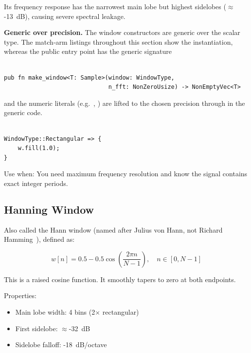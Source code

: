 Its frequency response has the narrowest main lobe but highest
sidelobes ($\approx$-13~dB), causing severe spectral leakage.

\textbf{Generic over precision.} The window constructors are generic
over the scalar type. The match-arm listings throughout this section
show the  instantiation, whereas the public entry point has
the generic signature

\begin{lstlisting}[caption={Generic make-window constructor signature}]

pub fn make_window<T: Sample>(window: WindowType,
                              n_fft: NonZeroUsize) -> NonEmptyVec<T>
\end{lstlisting}

\noindent and the numeric literals (e.g.\ , ) are
lifted to the chosen precision through  in the
generic code.

\begin{lstlisting}[caption={Rectangular window implementation}]

WindowType::Rectangular => {
    w.fill(1.0);
}
\end{lstlisting}

Use when: You need maximum frequency resolution and know the signal
contains exact integer periods.

\subsection{Hanning Window}\label{subsec:hann_window}

Also called the Hann window (named after Julius von Hann, not Richard
Hamming~\cite{harris1978use}), defined as:

\begin{equation}
  \label{eq:hann_window}
  w[n] = 0.5 - 0.5\cos\left(\frac{2\pi n}{N-1}\right), \quad n \in [0, N-1]
\end{equation}

This is a raised cosine function. It smoothly tapers to zero at both endpoints.

Properties:
\begin{itemize}[itemsep=2pt]
  \item Main lobe width: 4 bins (2$\times$ rectangular)
  \item First sidelobe: $\approx$-32~dB
  \item Sidelobe falloff: -18~dB/octave
\end{itemize}

